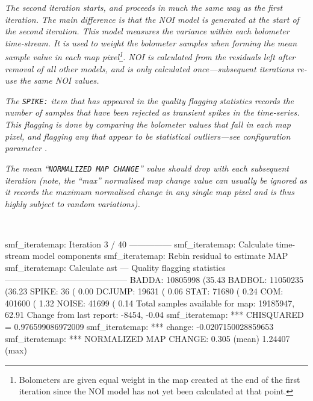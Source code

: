 \begin{terminalv}
\begin{terminalv}
\end{terminalv}

\emph{The second iteration starts, and proceeds in much the same way as the
first iteration. The main difference is that the NOI model is generated
at the start of the second iteration. This model measures the variance
within each bolometer time-stream. It is used to weight the bolometer
samples when forming the mean sample value in each map
pixel\footnote{Bolometers are given equal weight in the map created at
the end of the first iteration since the NOI model has not yet been
calculated at that point.}. NOI is calculated from the residuals left after
removal of all other models, and is only calculated once---subsequent
iterations re-use the same NOI values.}

\emph{The \texttt{SPIKE:} item that has appeared in the quality flagging
statistics records the number of samples that have been rejected as
transient spikes in the time-series. This flagging is done by comparing
the bolometer values that fall in each map pixel, and flagging any that
appear to be statistical outliers---see configuration parameter
.}

\emph{The mean ``\texttt{NORMALIZED MAP CHANGE}'' value should drop with each
subsequent iteration (note, the ``max'' normalised map change value
can usually be ignored as it records the maximum normalised change in any
single map pixel and is thus highly subject to random variations).}

~
\begin{terminalv}
smf_iteratemap: Iteration 3 / 40 ---------------
smf_iteratemap: Calculate time-stream model components
smf_iteratemap: Rebin residual to estimate MAP
smf_iteratemap: Calculate ast
--- Quality flagging statistics --------------------------------------------
 BADDA:   10805998 (35.43%
BADBOL:   11050235 (36.23%
 SPIKE:         36 ( 0.00%
DCJUMP:      19631 ( 0.06%
  STAT:      71680 ( 0.24%
   COM:     401600 ( 1.32%
 NOISE:      41699 ( 0.14%
Total samples available for map:   19185947, 62.91%
     Change from last report:      -8454, -0.04%
smf_iteratemap: *** CHISQUARED = 0.976599086972009
smf_iteratemap: *** change: -0.0207150028859653
smf_iteratemap: *** NORMALIZED MAP CHANGE: 0.305 (mean) 1.24407 (max)
\end{terminalv}


\end{terminalv}

